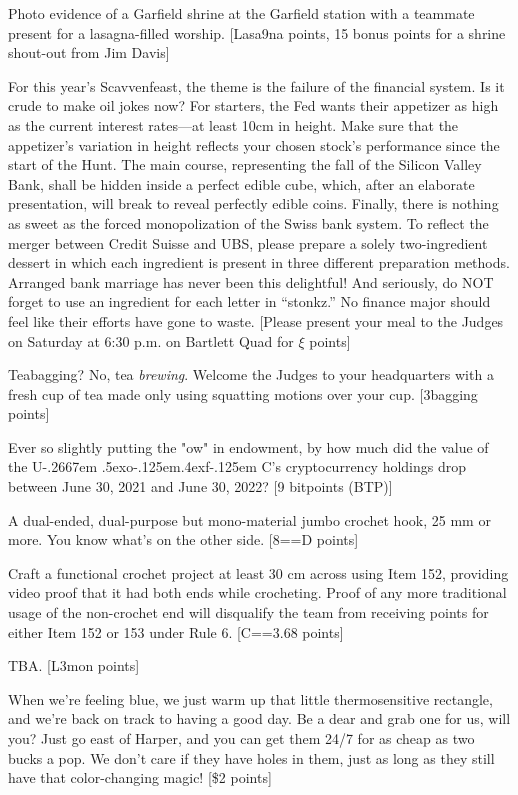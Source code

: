 \documentclass{book}
\def\UofC{U\kern-.2667em \lower.5ex\hbox{o}\kern-.125em\raise.4ex\hbox{f}\kern-.125em C}
\begin{document}
\begin{list}{}{}
\item Photo evidence of a Garfield shrine at the Garfield station with a teammate present for a lasagna-filled worship. [Lasa9na points, 15 bonus points for a shrine shout-out from Jim Davis]
\item For this year’s Scavvenfeast, the theme is the failure of the financial system. Is it crude to make oil jokes now? For starters, the Fed wants their appetizer as high as the current interest rates---at least 10cm in height. Make sure that the appetizer’s variation in height reflects your chosen stock’s performance since the start of the Hunt. The main course, representing the fall of the Silicon Valley Bank, shall be hidden inside a perfect edible cube, which, after an elaborate presentation, will break to reveal perfectly edible coins. Finally, there is nothing as sweet as the forced monopolization of the Swiss bank system. To reflect the merger between Credit Suisse and UBS, please prepare a solely two-ingredient dessert in which each ingredient is present in three different preparation methods. Arranged bank marriage has never been this delightful! And seriously, do NOT forget to use an ingredient for each letter in “stonkz.” No finance major should feel like their efforts have gone to waste. [Please present your meal to the Judges on Saturday at 6:30 p.m. on Bartlett Quad for $\xi$ points]
\newpage
\item Teabagging? No, tea \textit{brewing}. Welcome the Judges to your headquarters with a fresh cup of tea made only using squatting motions over your cup. [3bagging points]
\item Ever so slightly putting the "ow" in endowment, by how much did the value of the \UofC 's cryptocurrency holdings drop between June 30, 2021 and June 30, 2022? [9 bitpoints (BTP)]
\item A dual-ended, dual-purpose but mono-material jumbo crochet hook, 25 mm or more. You know what’s on the other side. [8==D points]
\item Craft a functional crochet project at least 30 cm across using Item 152, providing video proof that it had both ends while crocheting. Proof of any more traditional usage of the non-crochet end will disqualify the team from receiving points for either Item 152 or 153 under Rule 6. [C==3.68 points]
\item TBA. [L3mon points] %
\item When we're feeling blue, we just warm up that little thermosensitive rectangle, and we're back on track to having a good day. Be a dear and grab one for us, will you? Just go east of Harper, and you can get them 24/7 for as cheap as two bucks a pop. We don’t care if they have holes in them, just as long as they still have that color-changing magic! [\$2 points]

\end{list}
\end{document}
